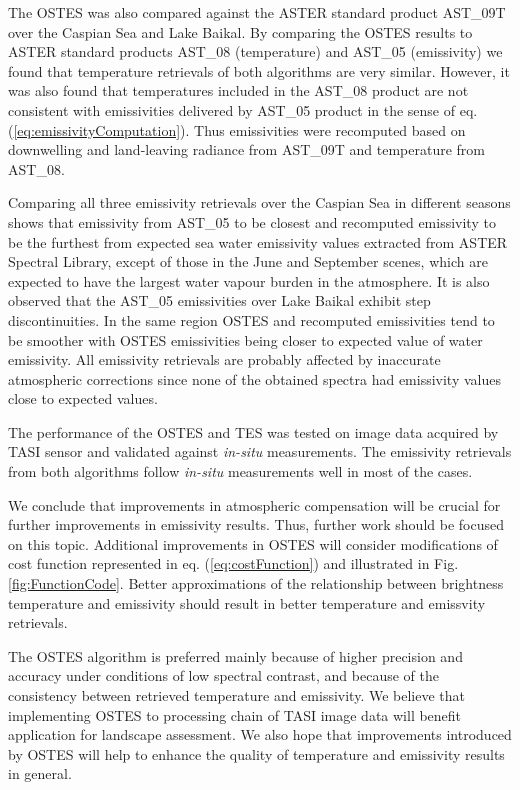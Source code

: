 The OSTES was also compared against the ASTER standard product AST\_09T over the Caspian Sea and Lake Baikal. By comparing the OSTES results to ASTER standard products AST\_08 (temperature) and AST\_05 (emissivity) we found that temperature retrievals of both algorithms are very similar. However, it was also found that temperatures included in the AST\_08 product are not consistent with emissivities delivered by AST\_05 product in the sense of eq. (\ref{eq:emissivityComputation}). Thus emissivities were recomputed based on downwelling and land-leaving radiance from AST\_09T and temperature from AST\_08. 

Comparing all three emissivity retrievals over the Caspian Sea in different seasons shows that emissivity from AST\_05 to be closest and recomputed emissivity to be the furthest from expected sea water emissivity values extracted from ASTER Spectral Library, except of those in the June and September scenes, which are expected to have the largest water vapour burden in the atmosphere. It is also observed that the AST\_05 emissivities over Lake Baikal exhibit step discontinuities. In the same region OSTES and recomputed emissivities tend to be smoother with OSTES emissivities being closer to expected value of water emissivity. All emissivity retrievals are probably affected by inaccurate atmospheric corrections since none of the obtained spectra had emissivity values close to expected values.

The performance of the OSTES and TES was tested on image data acquired by TASI sensor and validated against \textit{in-situ} measurements. The emissivity retrievals from both algorithms follow \textit{in-situ} measurements well in most of the cases. %

We conclude that improvements in atmospheric compensation will be crucial for further improvements in emissivity results. Thus, further work should be focused on this topic. Additional improvements in OSTES will consider modifications of cost function represented in eq. (\ref{eq:costFunction}) and illustrated in Fig. \ref{fig:FunctionCode}. Better approximations of the relationship between brightness temperature and emissivity should result in better temperature and emissvity retrievals. 

The OSTES algorithm is preferred mainly because of higher precision and accuracy under conditions of low spectral contrast, and because of the consistency between retrieved temperature and emissivity. We believe that implementing OSTES to processing chain of TASI image data will benefit application for landscape assessment. We also hope that improvements introduced by OSTES will help to enhance the quality of temperature and emissivity results in general.